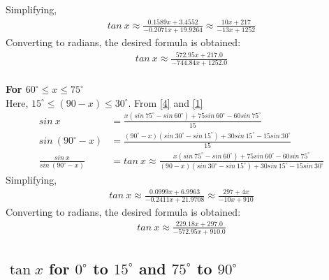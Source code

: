\documentclass[12pt,twoside, letterpaper, margin=1in]{article}
\begin{document}
Simplifying,
\\
\vspace{1.5pt}
\begin{align}
tan~x \approx \frac{0.1589x+3.4552}{-0.2071x+19.9264}\approx \frac{10x+217}{-13x+1252} \label{7}
\end{align}
Converting to radians, the desired formula is obtained:
\\
\vspace{1.5pt}
\begin{align}
tan~x \approx \frac{572.95 x + 217.0}{-744.84 x + 1252.0}
\end{align}
\\
\textbf{For $60^\circ \leq x \leq 75^\circ$ }\\
\vspace{1.5pt}
Here, $15^\circ \leq (90-x) \leq 30^\circ$. From \eqref{4} and \eqref{1}\\
\begin{align*}
sin~x &= \frac{x(sin~75^\circ - sin~60^\circ) + 75sin~60^\circ -60 sin~75^\circ}{15}\\
sin~(90^\circ-x) &= \frac{(90^\circ-x)(sin~30^\circ - sin~15^\circ) + 30sin~15^\circ -15 sin~30^\circ}{15}\\
\frac{sin~x}{sin~(90^\circ-x)} &= tan~x \approx \frac{x(sin~75^\circ - sin~60^\circ) + 75sin~60^\circ -60 sin~75^\circ}{(90-x)(sin~30^\circ - sin~15^\circ) + 30sin~15^\circ -15 sin~30^\circ}
\end{align*}
\vspace{1.5pt}
Simplifying,
\\
\vspace{1.5pt}
\begin{align}
tan~x \approx \frac{0.0999x+6.9963}{-0.2411x+21.9708} \approx \frac{297+4x}{-10x+910} \label{8}
\end{align}
Converting to radians, the desired formula is obtained:
\\
\vspace{1.5pt}
\begin{align}
tan~x \approx \frac{229.18 x + 297.0}{-572.95 x + 910.0}
\end{align}
\subsection{\texorpdfstring{$\tan x$ for $0^\circ$ to $15^\circ$ and $75^\circ$ to $90^\circ$}{tan x for 0 degrees to 15 degrees and 75 degrees to 90 degrees}}
\end{document}
